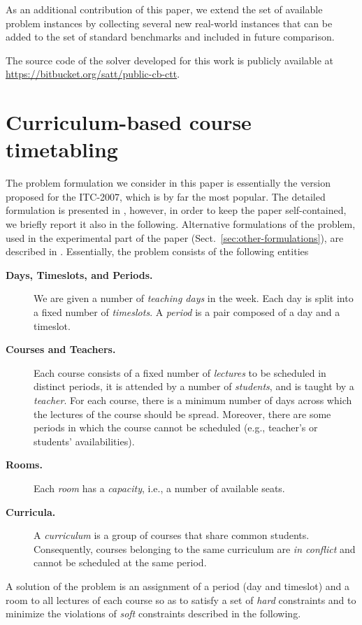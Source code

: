 \documentclass[authoryear,12pt]{article}
\begin{document}
As an additional contribution of this paper, we extend the set of available
problem instances by collecting several new real-world instances that can be
added to the set of standard benchmarks and included in future comparison.

The source code of the solver developed for this work is publicly available at
\url{https://bitbucket.org/satt/public-cb-ctt}.

\section{Curriculum-based course timetabling}

The problem formulation we consider in this paper is essentially the version
proposed for the ITC-2007, which is by far the most popular. The detailed
formulation is presented in \citep{DiMS07}, however, in order to keep the paper
self-contained, we briefly report it also in the following.  Alternative
formulations of the problem, used in the experimental part of the paper
(Sect.~\ref{sec:other-formulations}), are described in \citep{BDDS12}.
%
Essentially, the problem consists of the following entities

\begin{description}
\item[\textbf{Days, Timeslots, and Periods.}] We are given a number of
  \emph{teaching days} in the week. Each day is split into a fixed number of
  \emph{timeslots}. A \emph{period} is a pair composed of a day and a timeslot.
\item[\textbf{Courses and Teachers.}] Each course consists of
  \textup{a fixed} number of \emph{lectures} to be scheduled in distinct
  periods, it is attended by a number of \emph{students}, and is taught by a
  \emph{teacher}. For each course, there is a minimum number of days across
  which the lectures of the course should be spread. Moreover, there are some
  periods in which the course cannot be scheduled (e.g., teacher's or students'
  availabilities).
\item[\textbf{Rooms.}] Each \emph{room} has a \emph{capacity}, i.e., a number of
  available seats.
\item[\textbf{Curricula.}] A \emph{curriculum} is a group of courses that share
  common students. Consequently, courses belonging to the same curriculum are
  \emph{in conflict} and cannot be scheduled at the same period.
\end{description}

A solution of the problem is an assignment of a period (day and timeslot) and a
room to all lectures of each course so as to satisfy a set of \emph{hard}
constraints and to minimize the violations of \emph{soft} constraints described
in the following.
\end{document}
